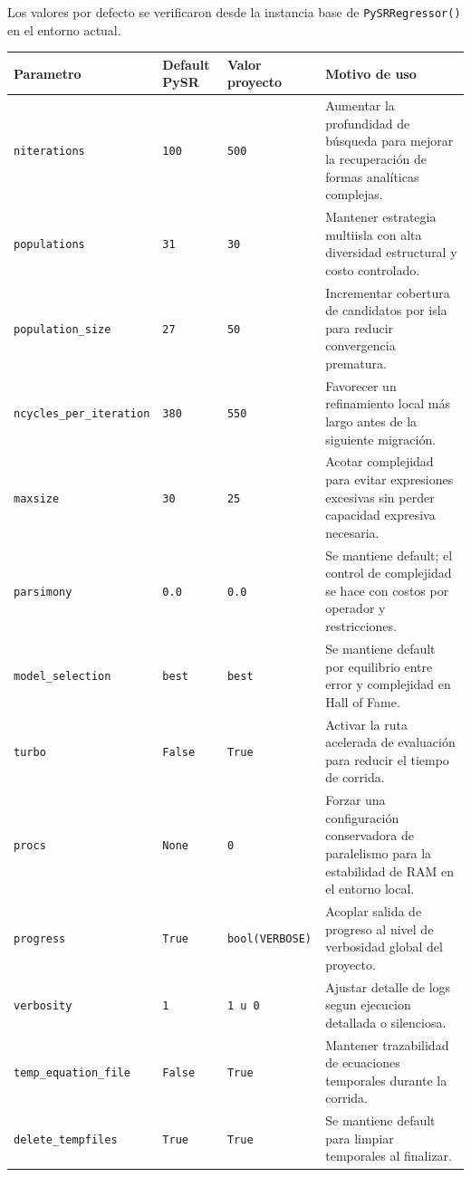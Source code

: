 \documentclass[12pt]{article}
\begin{document}
Los valores por defecto se verificaron desde la instancia base de \texttt{PySRRegressor()} en el entorno actual.

\begin{longtable}{|p{}|p{}|p{}|p{}|}
\hline
\textbf{Parametro} & \textbf{Default PySR} & \textbf{Valor proyecto} & \textbf{Motivo de uso} \\
\hline
\texttt{niterations} & \texttt{100} & \texttt{500} & Aumentar la profundidad de búsqueda para mejorar la recuperación de formas analíticas complejas. \\
\hline
\texttt{populations} & \texttt{31} & \texttt{30} & Mantener estrategia multiisla con alta diversidad estructural y costo controlado. \\
\hline
\texttt{population\_size} & \texttt{27} & \texttt{50} & Incrementar cobertura de candidatos por isla para reducir convergencia prematura. \\
\hline
\texttt{ncycles\_per\_iteration} & \texttt{380} & \texttt{550} & Favorecer un refinamiento local más largo antes de la siguiente migración. \\
\hline
\texttt{maxsize} & \texttt{30} & \texttt{25} & Acotar complejidad para evitar expresiones excesivas sin perder capacidad expresiva necesaria. \\
\hline
\texttt{parsimony} & \texttt{0.0} & \texttt{0.0} & Se mantiene default; el control de complejidad se hace con costos por operador y restricciones. \\
\hline
\texttt{model\_selection} & \texttt{best} & \texttt{best} & Se mantiene default por equilibrio entre error y complejidad en Hall of Fame. \\
\hline
\texttt{turbo} & \texttt{False} & \texttt{True} & Activar la ruta acelerada de evaluación para reducir el tiempo de corrida. \\
\hline
\texttt{procs} & \texttt{None} & \texttt{0} & Forzar una configuración conservadora de paralelismo para la estabilidad de RAM en el entorno local. \\
\hline
\texttt{progress} & \texttt{True} & \texttt{bool(VERBOSE)} & Acoplar salida de progreso al nivel de verbosidad global del proyecto. \\
\hline
\texttt{verbosity} & \texttt{1} & \texttt{1 u 0} & Ajustar detalle de logs segun ejecucion detallada o silenciosa. \\
\hline
\texttt{temp\_equation\_file} & \texttt{False} & \texttt{True} & Mantener trazabilidad de ecuaciones temporales durante la corrida. \\
\hline
\texttt{delete\_tempfiles} & \texttt{True} & \texttt{True} & Se mantiene default para limpiar temporales al finalizar. \\
\hline
\end{longtable}
\end{document}
